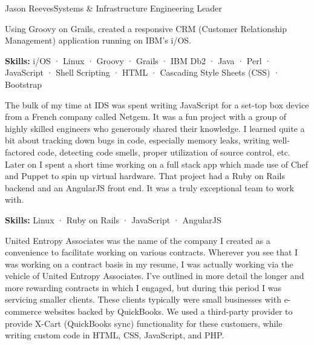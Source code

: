 \documentclass{article}
\begin{document}
\begin{cv}{Jason Reeves}{Systems \& Infrastructure Engineering Leader}
\begin{cvevent}[Jul 2013][Sep 2016]
  Using Groovy on Grails, created a responsive CRM (Customer Relationship Management) application running on IBM's i/OS.
  
  \vspace*{3mm}
  \textbf{Skills:} i/OS · Linux · Groovy · Grails · IBM Db2 · Java · Perl · JavaScript · Shell Scripting · HTML · Cascading Style Sheets (CSS) · Bootstrap
  \vspace*{5mm}
\end{cvevent}

\begin{cvevent}[Jul 2011][Oct 2015]
  The bulk of my time at IDS was spent writing JavaScript for a set-top box device from a French company called Netgem. It was a fun project with a group of highly skilled engineers who generously shared their knowledge. I learned quite a bit about tracking down bugs in code, especially memory leaks, writing well-factored code, detecting code smells, proper utilization of source control, etc. Later on I spent a short time working on a full stack app which made use of Chef and Puppet to spin up virtual hardware. That project had a Ruby on Rails backend and an AngularJS front end. It was a truly exceptional team to work with.
  
  \vspace*{3mm}
  \textbf{Skills:} Linux · Ruby on Rails · JavaScript · AngularJS
  \vspace*{5mm}
\end{cvevent}

\begin{cvevent}[Feb 2009][Jul 2011]
  United Entropy Associates was the name of the company I created as a convenience to facilitate working on various contracts. Wherever you see that I was working on a contract basis in my resume, I was actually working via the vehicle of United Entropy Associates. I've outlined in more detail the longer and more rewarding contracts in which I engaged, but during this period I was servicing smaller clients. These clients typically were small businesses with e-commerce websites backed by QuickBooks. We used a third-party provider to provide X-Cart (QuickBooks sync) functionality for these customers, while writing custom code in HTML, CSS, JavaScript, and PHP.
  

\end{cvevent}
\end{cv}
\end{document}
